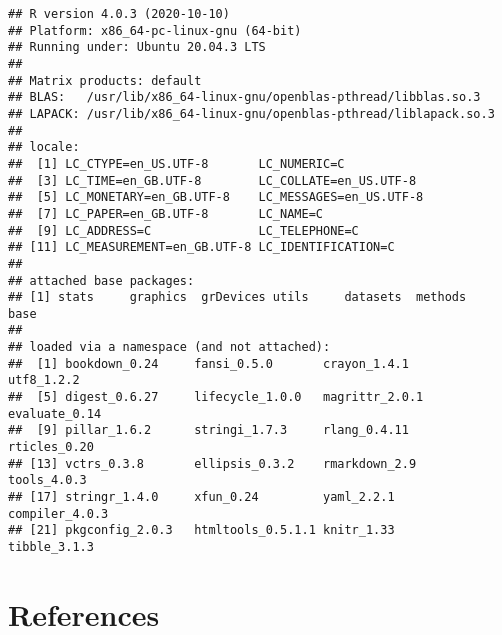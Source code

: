 \documentclass[smallextended]{svjour3}       %
\begin{document}
\begin{verbatim}
## R version 4.0.3 (2020-10-10)
## Platform: x86_64-pc-linux-gnu (64-bit)
## Running under: Ubuntu 20.04.3 LTS
## 
## Matrix products: default
## BLAS:   /usr/lib/x86_64-linux-gnu/openblas-pthread/libblas.so.3
## LAPACK: /usr/lib/x86_64-linux-gnu/openblas-pthread/liblapack.so.3
## 
## locale:
##  [1] LC_CTYPE=en_US.UTF-8       LC_NUMERIC=C              
##  [3] LC_TIME=en_GB.UTF-8        LC_COLLATE=en_US.UTF-8    
##  [5] LC_MONETARY=en_GB.UTF-8    LC_MESSAGES=en_US.UTF-8   
##  [7] LC_PAPER=en_GB.UTF-8       LC_NAME=C                 
##  [9] LC_ADDRESS=C               LC_TELEPHONE=C            
## [11] LC_MEASUREMENT=en_GB.UTF-8 LC_IDENTIFICATION=C       
## 
## attached base packages:
## [1] stats     graphics  grDevices utils     datasets  methods   base     
## 
## loaded via a namespace (and not attached):
##  [1] bookdown_0.24     fansi_0.5.0       crayon_1.4.1      utf8_1.2.2       
##  [5] digest_0.6.27     lifecycle_1.0.0   magrittr_2.0.1    evaluate_0.14    
##  [9] pillar_1.6.2      stringi_1.7.3     rlang_0.4.11      rticles_0.20     
## [13] vctrs_0.3.8       ellipsis_0.3.2    rmarkdown_2.9     tools_4.0.3      
## [17] stringr_1.4.0     xfun_0.24         yaml_2.2.1        compiler_4.0.3   
## [21] pkgconfig_2.0.3   htmltools_0.5.1.1 knitr_1.33        tibble_3.1.3
\end{verbatim}

\hypertarget{references}{%
\section{References}\label{references}}




\end{document}

